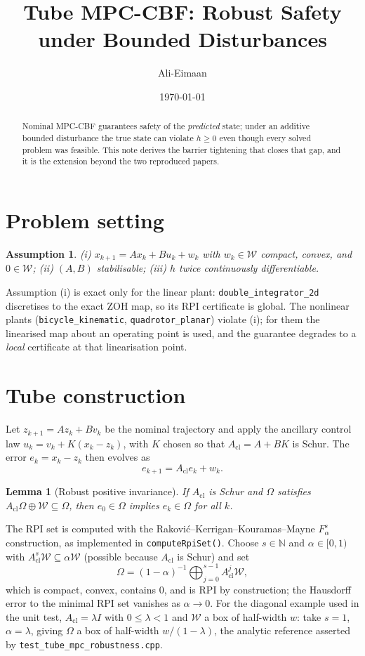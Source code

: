 \documentclass[11pt]{article}
\title{Tube MPC-CBF: Robust Safety under Bounded Disturbances}
\author{Ali-Eimaan}
\date{\today}
\newtheorem{lemma}{Lemma}
\newtheorem{assumption}{Assumption}
\newcommand{\Msum}{\oplus}
\begin{document}
\maketitle

\begin{abstract}
Nominal MPC-CBF guarantees safety of the \emph{predicted} state; under an additive bounded
disturbance the true state can violate $h \ge 0$ even though every solved problem was feasible.
This note derives the barrier tightening that closes that gap, and it is the extension beyond the
two reproduced papers.
\end{abstract}

\section{Problem setting}
\begin{assumption}
(i) $x_{k+1} = A x_k + B u_k + w_k$ with $w_k \in \mathcal{W}$ compact, convex, and $0 \in
\mathcal{W}$; (ii) $(A,B)$ stabilisable; (iii) $h$ twice continuously differentiable.
\end{assumption}

Assumption (i) is exact only for the linear plant: \texttt{double\_integrator\_2d} discretises to
the exact ZOH map, so its RPI certificate is global. The nonlinear plants
(\texttt{bicycle\_kinematic}, \texttt{quadrotor\_planar}) violate (i); for them the linearised map
about an operating point is used, and the guarantee degrades to a \emph{local} certificate at that
linearisation point.

\section{Tube construction}
Let $z_{k+1} = A z_k + B v_k$ be the nominal trajectory and apply the ancillary control law
$u_k = v_k + K(x_k - z_k)$, with $K$ chosen so that $A_{\mathrm{cl}} = A + BK$ is Schur. The error
$e_k = x_k - z_k$ then evolves as
\[
e_{k+1} = A_{\mathrm{cl}} e_k + w_k .
\]

\begin{lemma}[Robust positive invariance]
If $A_{\mathrm{cl}}$ is Schur and $\Omega$ satisfies
$A_{\mathrm{cl}} \Omega \Msum \mathcal{W} \subseteq \Omega$, then $e_0 \in \Omega$ implies
$e_k \in \Omega$ for all $k$.
\end{lemma}

The RPI set is computed with the Rakovi\'c--Kerrigan--Kouramas--Mayne $F_\alpha^s$ construction,
as implemented in \texttt{computeRpiSet()}. Choose $s \in \mathbb{N}$ and $\alpha \in [0,1)$ with
$A_{\mathrm{cl}}^s \mathcal{W} \subseteq \alpha \mathcal{W}$ (possible because $A_{\mathrm{cl}}$ is
Schur) and set
\[
\Omega = (1-\alpha)^{-1} \bigoplus_{j=0}^{s-1} A_{\mathrm{cl}}^j \mathcal{W},
\]
which is compact, convex, contains $0$, and is RPI by construction; the Hausdorff error to the
minimal RPI set vanishes as $\alpha \to 0$. For the diagonal example used in the unit test,
$A_{\mathrm{cl}} = \lambda I$ with $0 \le \lambda < 1$ and $\mathcal{W}$ a box of half-width $w$:
take $s = 1$, $\alpha = \lambda$, giving $\Omega$ a box of half-width $w/(1-\lambda)$, the
analytic reference asserted by \texttt{test\_tube\_mpc\_robustness.cpp}.
\end{document}
